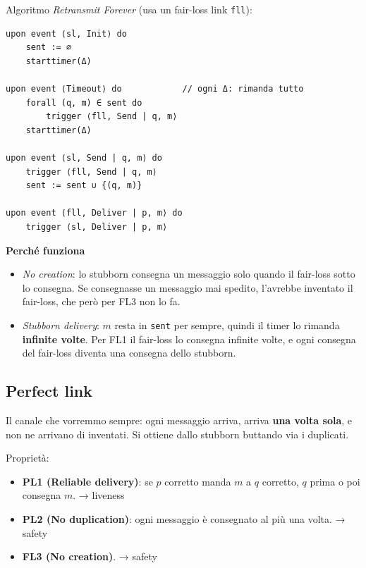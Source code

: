 Algoritmo \emph{Retransmit Forever} (usa un fair-loss link \texttt{fll}):

\begin{verbatim}
upon event ⟨sl, Init⟩ do
    sent := ∅
    starttimer(Δ)

upon event ⟨Timeout⟩ do            // ogni Δ: rimanda tutto
    forall (q, m) ∈ sent do
        trigger ⟨fll, Send | q, m⟩
    starttimer(Δ)

upon event ⟨sl, Send | q, m⟩ do
    trigger ⟨fll, Send | q, m⟩
    sent := sent ∪ {(q, m)}

upon event ⟨fll, Deliver | p, m⟩ do
    trigger ⟨sl, Deliver | p, m⟩
\end{verbatim}

\textbf{Perché funziona}

\begin{itemize}
\tightlist
\item
  \emph{No creation}: lo stubborn consegna un messaggio solo quando il fair-loss sotto lo consegna. Se consegnasse un messaggio mai spedito, l'avrebbe inventato il fair-loss, che però per FL3 non lo fa.
\item
  \emph{Stubborn delivery}: \(m\) resta in \texttt{sent} per sempre, quindi il timer lo rimanda \textbf{infinite volte}. Per FL1 il fair-loss lo consegna infinite volte, e ogni consegna del fair-loss diventa una consegna dello stubborn.
\end{itemize}

\subsection{Perfect link}

\begin{inbreve}

Il canale che vorremmo sempre: ogni messaggio arriva, arriva \textbf{una volta sola}, e non ne arrivano di inventati. Si ottiene dallo stubborn buttando via i duplicati.

\end{inbreve}

Proprietà:

\begin{itemize}
\tightlist
\item
  \textbf{PL1 (Reliable delivery)}: se \(p\) corretto manda \(m\) a \(q\) corretto, \(q\) prima o poi consegna \(m\). → liveness
\item
  \textbf{PL2 (No duplication)}: ogni messaggio è consegnato al più una volta. → safety
\item
  \textbf{FL3 (No creation)}. → safety
\end{itemize}

